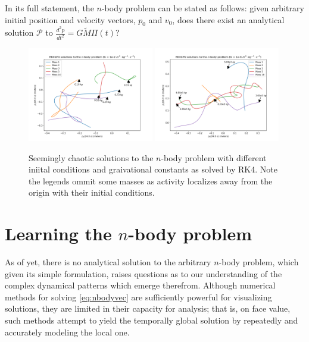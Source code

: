 \documentclass{article}
\numberwithin{theorem}{section}
\numberwithin{equation}{section}
\def\scriptp{{\mathcal P}}
\begin{document}
In its full statement, the $n$-body problem can be stated as follows: given arbitrary initial position and velocity vectors, $p_0$ and $v_0$, does there exist an analytical solution $\scriptp$ to $\frac{d^2p}{dt^2} = G \tilde{M}  \Pi(t)$?


\begin{figure}
\begin{center}
	\includegraphics[width=0.49\textwidth]{solution.png} 
	\includegraphics[width=0.49\textwidth]{solution2.png}
\caption{Seemingly chaotic solutions to the $n$-body problem with different iniital conditions and graivational constants as solved by RK4. Note the legends ommit some masses as activity localizes away from the origin with their initial conditions.}
\end{center}
\end{figure}

\section{Learning the $n$-body problem}
As of yet, there is no analytical solution to the arbitrary $n$-body problem, which given its simple formulation, raises questions as to our understanding of the complex dynamical patterns which emerge therefrom. Although numerical methods for solving \eqref{eq:nbodyvec} are sufficiently powerful for visualizing solutions, they are limited in their capacity for analysis; that is, on face value, such methods attempt to yield the temporally global solution by repeatedly and accurately modeling the local one. 
\end{document}
